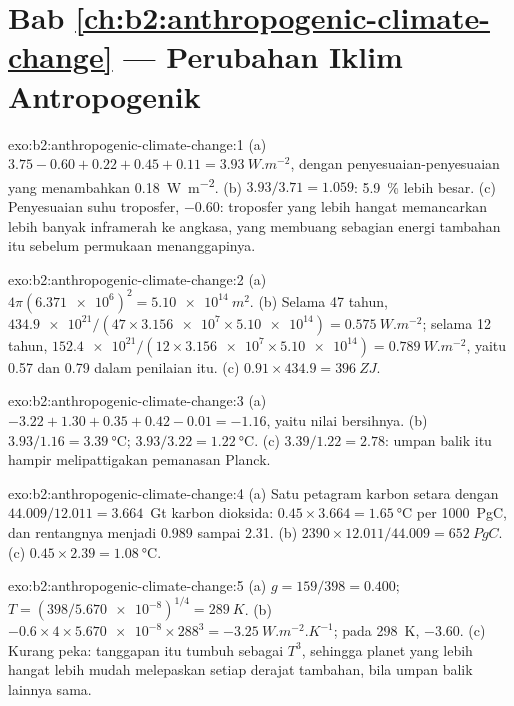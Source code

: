 \section*{Bab \ref{ch:b2:anthropogenic-climate-change} --- Perubahan Iklim Antropogenik}

\begin{solution}{exo:b2:anthropogenic-climate-change:1}
(a) $3.75 - 0.60 + 0.22 + 0.45 + 0.11 = \qty{3.93}{W.m^{-2}}$, dengan penyesuaian-penyesuaian yang menambahkan
\qty{0.18}{W.m^{-2}}. (b) $3.93/3.71 = 1.059$: \qty{5.9}{\percent} lebih besar. (c) Penyesuaian suhu
troposfer, $-0.60$: troposfer yang lebih hangat memancarkan lebih banyak inframerah ke angkasa, yang membuang
sebagian energi tambahan itu sebelum permukaan menanggapinya.
\end{solution}

\begin{solution}{exo:b2:anthropogenic-climate-change:2}
(a) $4\pi(\num{6.371e6})^2 = \qty{5.10e14}{m^2}$. (b) Selama 47 tahun, $\num{434.9e21}/(47 \times
\num{3.156e7} \times \num{5.10e14}) = \qty{0.575}{W.m^{-2}}$; selama 12 tahun, $\num{152.4e21}/(12
\times \num{3.156e7} \times \num{5.10e14}) = \qty{0.789}{W.m^{-2}}$, yaitu 0.57 dan 0.79 dalam
penilaian itu. (c) $0.91 \times 434.9 = \qty{396}{ZJ}$.
\end{solution}

\begin{solution}{exo:b2:anthropogenic-climate-change:3}
(a) $-3.22 + 1.30 + 0.35 + 0.42 - 0.01 = \num{-1.16}$, yaitu nilai bersihnya. (b) $3.93/1.16 =
\qty{3.39}{\celsius}$; $3.93/3.22 = \qty{1.22}{\celsius}$. (c) $3.39/1.22 = 2.78$: umpan balik itu
hampir melipattigakan pemanasan Planck.
\end{solution}

\begin{solution}{exo:b2:anthropogenic-climate-change:4}
(a) Satu petagram karbon setara dengan $44.009/12.011 = 3.664$~Gt karbon dioksida: $0.45 \times 3.664 =
\qty{1.65}{\celsius}$ per \qty{1000}{PgC}, dan rentangnya menjadi 0.989 sampai 2.31. (b) $2390 \times
12.011/44.009 = \qty{652}{PgC}$. (c) $0.45 \times 2.39 = \qty{1.08}{\celsius}$.
\end{solution}

\begin{solution}{exo:b2:anthropogenic-climate-change:5}
(a) $g = 159/398 = 0.400$; $T = (398/\num{5.670e-8})^{1/4} = \qty{289}{K}$. (b) $-0.6 \times 4
\times \num{5.670e-8} \times 288^3 = \qty{-3.25}{W.m^{-2}.K^{-1}}$; pada \qty{298}{K}, $-3.60$.
(c) Kurang peka: tanggapan itu tumbuh sebagai $T^3$, sehingga planet yang lebih hangat lebih mudah melepaskan setiap derajat
tambahan, bila umpan balik lainnya sama.
\end{solution}

